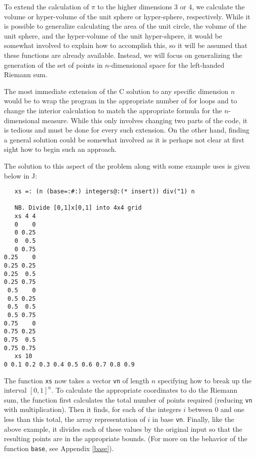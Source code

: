 To extend the calculation of $\pi$ to the higher dimensions 3 or 4, 
we calculate the volume or hyper-volume of the unit sphere or hyper-sphere, respectively. 
While it is possible to generalize calculating the area of the unit circle, 
the volume of the unit sphere, and the hyper-volume of the unit hyper-shpere, 
it would be somewhat involved to explain how to accomplish this, 
so it will be assumed that these functions are already available.
Instead, we will focus on generalizing the generation of 
the set of points in $n$-dimensional space for the left-handed Riemann sum.

The most immediate extension of the C solution to any specific dimension $n$
would be to wrap the program in the appropriate number of for loops 
and to change the interior calculation to match the appropriate formula for the $n$-dimensional measure.
While this only involves changing two parts of the code, it is tedious 
and must be done for every such extension. 
On the other hand, finding a general solution could be somewhat involved 
as it is perhaps not clear at first sight how to begin such an approach.

The solution to this aspect of the problem along with some example uses is given below in J:

\begin{singlespacing}
\begin{small}
\begin{verbatim}
   xs =: (n (base=:#:) integers@:(* insert)) div("1) n

   NB. Divide [0,1]x[0,1] into 4x4 grid
   xs 4 4
   0    0
   0 0.25
   0  0.5
   0 0.75
0.25    0
0.25 0.25
0.25  0.5
0.25 0.75
 0.5    0
 0.5 0.25
 0.5  0.5
 0.5 0.75
0.75    0
0.75 0.25
0.75  0.5
0.75 0.75
   xs 10
0 0.1 0.2 0.3 0.4 0.5 0.6 0.7 0.8 0.9
\end{verbatim}
\end{small}
\end{singlespacing}

The function \texttt{xs} now takes a vector \texttt{vn} of length $n$ 
specifying how to break up the interval $[0,1]^n$.
To calculate the appropriate coordinates to do the Riemann sum, 
the function first calculates the total number of points required (reducing \texttt{vn} with multiplication). 
Then it finds, for each of the integers $i$ between 0 and one less than this total, 
the array representation of $i$ in base \texttt{vn}. 
Finally, like the above example, it divides each of these values by the original input 
so that the resulting points are in the appropriate bounds.
(For more on the behavior of the function \texttt{base}, see Appendix \ref{base}). %


